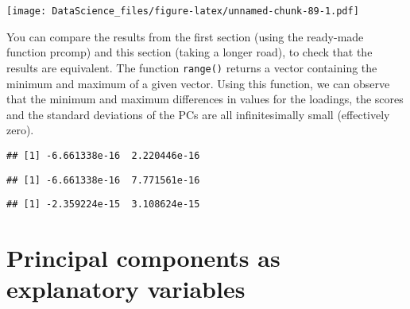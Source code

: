 \documentclass[
]{book}
\newenvironment{Shaded}{\begin{snugshade}}{\end{snugshade}}
\newcommand{\FunctionTok}[1]{\textcolor[rgb]{0.00,0.00,0.00}{#1}}
\newcommand{\NormalTok}[1]{#1}
\newcommand{\SpecialCharTok}[1]{\textcolor[rgb]{0.00,0.00,0.00}{#1}}
\begin{document}
\texttt{[image: DataScience\_files/figure-latex/unnamed-chunk-89-1.pdf]}

You can compare the results from the first section (using the ready-made function prcomp) and this section (taking a longer road), to check that the results are equivalent. The function \texttt{range()} returns a vector containing the minimum and maximum of a given vector. Using this function, we can observe that the minimum and maximum differences in values for the loadings, the scores and the standard deviations of the PCs are all infinitesimally small (effectively zero).

\begin{Shaded}
\end{Shaded}

\begin{verbatim}
## [1] -6.661338e-16  2.220446e-16
\end{verbatim}

\begin{Shaded}
\end{Shaded}

\begin{verbatim}
## [1] -6.661338e-16  7.771561e-16
\end{verbatim}

\begin{Shaded}
\end{Shaded}

\begin{verbatim}
## [1] -2.359224e-15  3.108624e-15
\end{verbatim}

\hypertarget{principal-components-as-explanatory-variables}{%
\section{Principal components as explanatory variables}\label{principal-components-as-explanatory-variables}}
\end{document}

